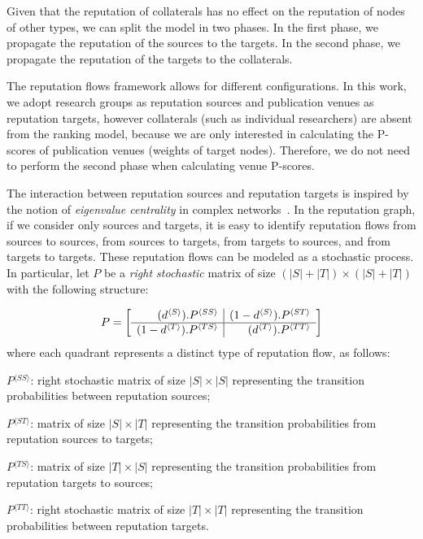 \documentclass[notitlepage]{svjour3}
\begin{document}
Given that the reputation of collaterals has no effect on
the reputation of nodes of other types, we can split the model
in two phases. In the first phase, we propagate the reputation
of the sources to the targets. In the second phase, we
propagate the reputation of the targets to the collaterals.

The reputation flows framework allows for different configurations.
In this work, we adopt research groups as reputation sources and publication 
venues as reputation targets, however collaterals (such as individual researchers) 
are absent from the ranking model, because we are only interested in calculating the 
P-scores of publication venues (weights of target nodes). Therefore, we do not need to
perform the second phase when calculating venue P-scores.


The interaction between reputation sources and reputation targets is inspired by the 
notion of {\em eigenvalue centrality} in complex 
networks~\cite{Brin1998,Langville2008,Newman2010}. 
In the reputation graph, if we consider only sources and targets, it is easy to 
identify reputation flows from sources to sources, from sources to targets, from 
targets to sources, and from targets to targets. These reputation flows can be 
modeled as a stochastic process. 
In particular, let $P$ be a \emph{right stochastic} %
matrix of size $(|S|+|T|) \times (|S|+|T|)$ with the following structure: 

\newcommand{\bkt}[1]{ {^{\langle #1 \rangle}} }

\begin{align}\label{eq:newp}
P =
\left[
\begin{array}{r | r}
(d\bkt{S}) . P\bkt{SS}  & (1-d\bkt{S}) . P\bkt{ST} \\
\hline
(1-d\bkt{T}) . P\bkt{TS}  & (d\bkt{T}) . P\bkt{TT} \\
\end{array}
\right]
\end{align}
\noindent where each quadrant represents a distinct type of reputation flow, as follows: 

\begin{description}
\item $P\bkt{SS}$: right stochastic matrix of size $|S|\times |S|$ representing the 
transition probabilities between reputation sources;
\item $P\bkt{ST}$: matrix of size $|S|\times |T|$ representing the transition probabilities from reputation sources to targets;
\item $P\bkt{TS}$: matrix of size $|T|\times |S|$ representing the transition probabilities from reputation targets to sources;
\item $P\bkt{TT}$: right stochastic matrix of size $|T|\times |T|$ representing the transition probabilities between reputation targets.
\end{description}
\end{document}
